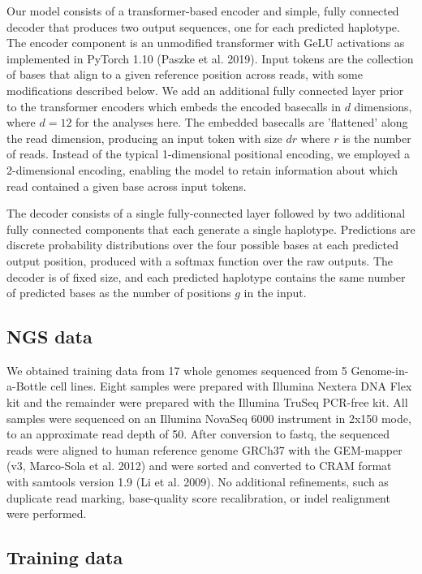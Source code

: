 \documentclass[]{article}
\begin{document}
Our model consists of a transformer-based encoder and simple, fully connected decoder that produces two output sequences, one for each predicted haplotype. The encoder component is an unmodified transformer with GeLU activations as implemented in PyTorch 1.10 (Paszke et al. 2019). Input tokens are the collection of bases that align to a given reference position across reads, with some modifications described below. We add an additional fully connected layer prior to the transformer encoders which embeds the encoded basecalls in $d$ dimensions, where $d=12$ for the analyses here. The embedded basecalls are 'flattened' along the read dimension, producing an input token with size $dr$ where $r$ is the number of reads. Instead of the typical 1-dimensional positional encoding, we employed a 2-dimensional encoding, enabling the model to retain information about which read contained a given base across input tokens. 

The decoder consists of a single fully-connected layer followed by two additional fully connected components that each generate a single haplotype. Predictions are discrete probability distributions over the four possible bases at each predicted output position, produced with a softmax function over the raw outputs. The decoder is of fixed size, and each predicted haplotype contains the same number of predicted bases as the number of positions $g$ in the input. 


\subsection{NGS data}

We obtained training data from 17 whole genomes sequenced from 5 Genome-in-a-Bottle cell lines. Eight samples were prepared with Illumina Nextera DNA Flex kit and the remainder were prepared with the Illumina TruSeq PCR-free kit. All samples were sequenced on an Illumina NovaSeq 6000 instrument in 2x150 mode, to an approximate read depth of 50. After conversion to fastq, the sequenced reads were aligned to human reference genome GRCh37 with the GEM-mapper (v3, Marco-Sola et al. 2012) and were sorted and converted to CRAM format with samtools version 1.9 (Li et al. 2009). No additional refinements, such as duplicate read marking, base-quality score recalibration, or indel realignment were performed.

\subsection{Training data}
\end{document}
